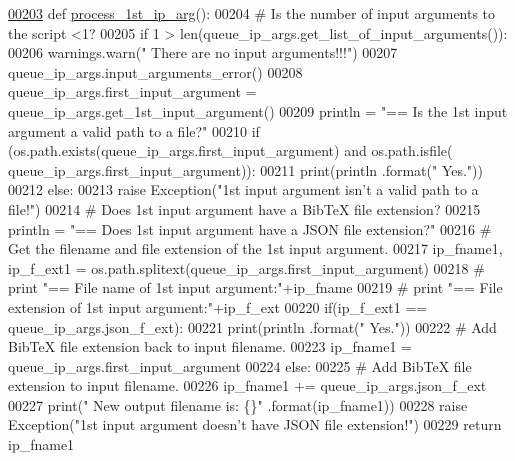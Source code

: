 \begin{DoxyCode}
\hypertarget{classutilities_1_1queue__ip__arguments_1_1queue__ip__args_l00203}{}\hyperlink{classutilities_1_1queue__ip__arguments_1_1queue__ip__args_ae1fc6d7af2e429d0656dbf388711db94}{00203}     \textcolor{keyword}{def }\hyperlink{classutilities_1_1queue__ip__arguments_1_1queue__ip__args_ae1fc6d7af2e429d0656dbf388711db94}{process\_1st\_ip\_arg}():
00204         \textcolor{comment}{#   Is the number of input arguments to the script <1?}
00205         \textcolor{keywordflow}{if} 1 > len(queue\_ip\_args.get\_list\_of\_input\_arguments()):
00206             warnings.warn(\textcolor{stringliteral}{" There are no input arguments!!!"})
00207             queue\_ip\_args.input\_arguments\_error()
00208         queue\_ip\_args.first\_input\_argument = queue\_ip\_args.get\_1st\_input\_argument()
00209         println = \textcolor{stringliteral}{"==   Is the 1st input argument a valid path to a file?"}
00210         \textcolor{keywordflow}{if} (os.path.exists(queue\_ip\_args.first\_input\_argument) \textcolor{keywordflow}{and} os.path.isfile(
      queue\_ip\_args.first\_input\_argument)):
00211             print(println .format(\textcolor{stringliteral}{" Yes."}))
00212         \textcolor{keywordflow}{else}:
00213             \textcolor{keywordflow}{raise} Exception(\textcolor{stringliteral}{"1st input argument isn't a valid path to a file!"})
00214         \textcolor{comment}{#   Does 1st input argument have a BibTeX file extension?}
00215         println = \textcolor{stringliteral}{"==   Does 1st input argument have a JSON file extension?"}
00216         \textcolor{comment}{#   Get the filename and file extension of the 1st input argument.}
00217         ip\_fname1, ip\_f\_ext1 = os.path.splitext(queue\_ip\_args.first\_input\_argument)
00218 \textcolor{comment}{#   print "==   File name of 1st input argument:"+ip\_fname}
00219 \textcolor{comment}{#   print "==   File extension of 1st input argument:"+ip\_f\_ext}
00220         if(ip\_f\_ext1 == queue\_ip\_args.json\_f\_ext):
00221             print(println .format(\textcolor{stringliteral}{" Yes."}))
00222             \textcolor{comment}{#   Add BibTeX file extension back to input filename.}
00223             ip\_fname1 = queue\_ip\_args.first\_input\_argument
00224         \textcolor{keywordflow}{else}:
00225             \textcolor{comment}{#   Add BibTeX file extension to input filename.}
00226             ip\_fname1 += queue\_ip\_args.json\_f\_ext
00227             print(\textcolor{stringliteral}{" New output filename is: \{\}"} .format(ip\_fname1))
00228             \textcolor{keywordflow}{raise} Exception(\textcolor{stringliteral}{"1st input argument doesn't have JSON file extension!"})
00229         \textcolor{keywordflow}{return} ip\_fname1
\end{DoxyCode}
\hypertarget{classutilities_1_1queue__ip__arguments_1_1queue__ip__args_a82d245379c48196f61d4268882dd5c6d}{}
